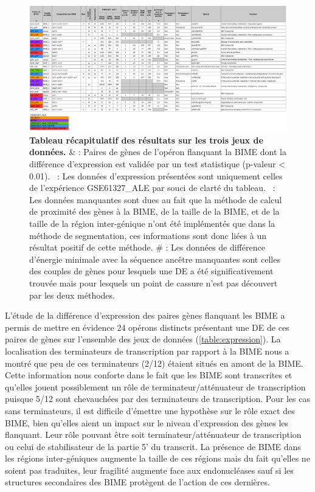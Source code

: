 \documentclass[12pt,a4paper]{report}
\begin{document}
\begin{onehalfspace}
\begin{figure}
\centerline{\includegraphics[scale=0.85]{figures/synthese_french.png}}
\caption{\textbf{Tableau récapitulatif des résultats sur les trois jeux de données.} \& : Paires de gènes de l'opéron flanquant la BIME dont la différence d'expression est validée par un test statistique (p-valeur < 0.01). \dag~: Les données d'expression présentées sont uniquement celles de l'expérience GSE61327\_ALE par souci de clarté du tableau. \ddag~: Les données manquantes sont dues au fait que la méthode de calcul de proximité des gènes à la BIME, de la taille de la BIME, et de la taille de la région inter-génique n'ont été implémentés que dans la méthode de segmentation, ces informations sont donc liées à un résultat positif de cette méthode. \# : Les données de différence d'énergie minimale avec la séquence ancêtre manquantes sont celles des couples de gènes pour lesquels une DE a été significativement trouvée mais pour lesquels un point de cassure n'est pas découvert par les deux méthodes.}
\label{fig:bilan}
\end{figure}

L'étude de la différence d'expression des paires gènes flanquant les BIME a permis de mettre en évidence 24 opérons distincts présentant une DE de ces paires de gènes sur l'ensemble des jeux de données (\autoref{table:expression}). La localisation des terminateurs de transcription par rapport à la BIME nous a montré que peu de ces terminateurs (2/12) étaient situés en amont de la BIME. Cette information nous conforte dans le fait que les BIME sont transcrites et qu'elles jouent possiblement un rôle de terminateur/atténuateur de transcription puisque 5/12 sont chevauchées par des terminateurs de transcription. Pour les cas sans terminateurs, il est difficile d'émettre une hypothèse sur le rôle exact des BIME, bien qu'elles aient un impact sur le niveau d'expression des gènes les flanquant. Leur rôle pouvant être soit terminateur/atténuateur de transcription ou celui de stabilisateur de la partie 5' du transcrit. La présence de BIME dans les régions inter-géniques augmente la taille de ces régions mais du fait qu'elles ne soient pas traduites, leur fragilité augmente face aux endonucléases sauf si les structures secondaires des BIME protègent de l'action de ces dernières.


\end{onehalfspace}
\end{document}
